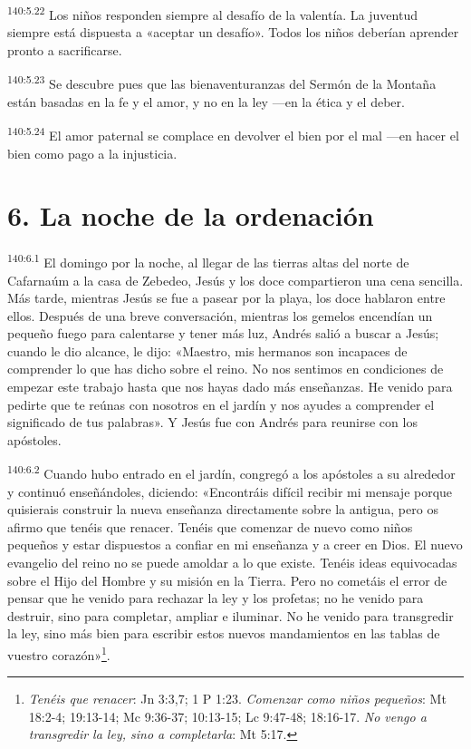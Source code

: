 \par
\textsuperscript{140:5.22} Los niños responden siempre al desafío de la valentía. La juventud siempre está dispuesta a «aceptar un desafío». Todos los niños deberían aprender pronto a sacrificarse.

\par
\textsuperscript{140:5.23} Se descubre pues que las bienaventuranzas del Sermón de la Montaña están basadas en la fe y el amor, y no en la ley ---en la ética y el deber.

\par
\textsuperscript{140:5.24} El amor paternal se complace en devolver el bien por el mal ---en hacer el bien como pago a la injusticia.

\section*{6. La noche de la ordenación}
\par
\textsuperscript{140:6.1} El domingo por la noche, al llegar de las tierras altas del norte de Cafarnaúm a la casa de Zebedeo, Jesús y los doce compartieron una cena sencilla. Más tarde, mientras Jesús se fue a pasear por la playa, los doce hablaron entre ellos. Después de una breve conversación, mientras los gemelos encendían un pequeño fuego para calentarse y tener más luz, Andrés salió a buscar a Jesús; cuando le dio alcance, le dijo: «Maestro, mis hermanos son incapaces de comprender lo que has dicho sobre el reino. No nos sentimos en condiciones de empezar este trabajo hasta que nos hayas dado más enseñanzas. He venido para pedirte que te reúnas con nosotros en el jardín y nos ayudes a comprender el significado de tus palabras». Y Jesús fue con Andrés para reunirse con los apóstoles.

\par
\textsuperscript{140:6.2} Cuando hubo entrado en el jardín, congregó a los apóstoles a su alrededor y continuó enseñándoles, diciendo: «Encontráis difícil recibir mi mensaje porque quisierais construir la nueva enseñanza directamente sobre la antigua, pero os afirmo que tenéis que renacer. Tenéis que comenzar de nuevo como niños pequeños y estar dispuestos a confiar en mi enseñanza y a creer en Dios. El nuevo evangelio del reino no se puede amoldar a lo que existe. Tenéis ideas equivocadas sobre el Hijo del Hombre y su misión en la Tierra. Pero no cometáis el error de pensar que he venido para rechazar la ley y los profetas; no he venido para destruir, sino para completar, ampliar e iluminar. No he venido para transgredir la ley, sino más bien para escribir estos nuevos mandamientos en las tablas de vuestro corazón»\footnote{\textit{Tenéis que renacer}: Jn 3:3,7; 1 P 1:23. \textit{Comenzar como niños pequeños}: Mt 18:2-4; 19:13-14; Mc 9:36-37; 10:13-15; Lc 9:47-48; 18:16-17. \textit{No vengo a transgredir la ley, sino a completarla}: Mt 5:17.}.

